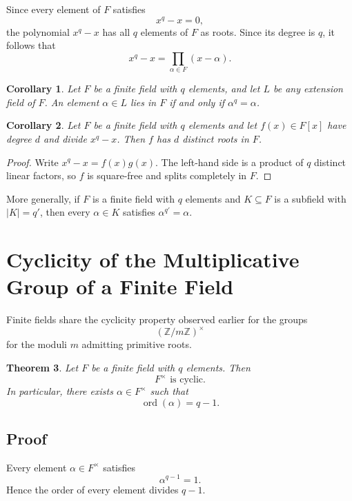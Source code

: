 \documentclass[11pt]{article}
\newtheorem{theorem}{Theorem}[section]
\newtheorem{corollary}[theorem]{Corollary}
\theoremstyle{remark}
\DeclareMathOperator{\ord}{ord}
\newcommand{\units}[1]{\left(\mathbb Z/#1\mathbb Z\right)^\times}
\begin{document}
Since every element of $F$ satisfies
\[
    x^q-x=0,
\]
the polynomial $x^q-x$ has all $q$ elements of $F$ as roots. Since its
degree is $q$, it follows that
\[
    \boxed{
    x^q-x
    =
    \prod_{\alpha\in F}(x-\alpha)
    }.
\]

\begin{corollary}
Let $F$ be a finite field with $q$ elements, and let $L$ be any extension
field of $F$. An element $\alpha\in L$ lies in $F$ if and only if
$\alpha^q=\alpha$.
\end{corollary}

\begin{corollary}
Let $F$ be a finite field with $q$ elements and let $f(x)\in F[x]$ have
degree $d$ and divide $x^q-x$. Then $f$ has $d$ distinct roots in $F$.
\end{corollary}

\begin{proof}
Write $x^q-x=f(x)g(x)$. The left-hand side is a product of $q$ distinct
linear factors, so $f$ is square-free and splits completely in $F$.
\end{proof}

More generally, if $F$ is a finite field with $q$ elements and
$K\subseteq F$ is a subfield with $|K|=q'$, then every $\alpha\in K$
satisfies $\alpha^{q'}=\alpha$.

\section{Cyclicity of the Multiplicative Group of a Finite Field}

Finite fields share the cyclicity property observed earlier for the
groups
\[
    \units m
\]
for the moduli $m$ admitting primitive roots.

\begin{theorem}
Let $F$ be a finite field with $q$ elements. Then
\[
    \boxed{F^\times\text{ is cyclic}.}
\]
In particular, there exists $\alpha\in F^\times$ such that
\[
    \ord(\alpha)=q-1.
\]
\end{theorem}

\subsection{Proof}

Every element $\alpha\in F^\times$ satisfies
\[
    \alpha^{q-1}=1.
\]
Hence the order of every element divides $q-1$.
\end{document}
